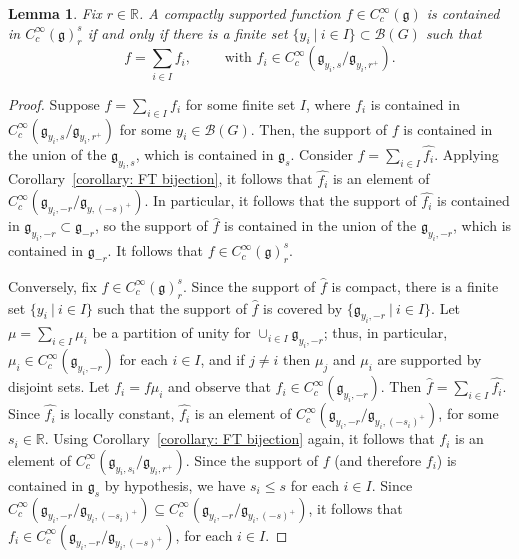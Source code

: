\documentclass[11pt]{amsart}
\newtheorem{lemma}[theorem]{Lemma}
\theoremstyle{definition}
\theoremstyle{remark}
\numberwithin{equation}{theorem}
\def\R{{\mathbb{R}}}
\def\GF{{G}}
\def\gF{{\mathfrak{g}}}
\def\B{{\mathcal{B}}}
\def\Sch#1{{C^\infty_c(#1)}}
\def\rightcoset{{ / }}
\def\tq{{\ \vert\ }}
\begin{document}
\begin{lemma}\label{lemma: depth r Hecke}
Fix $r\in \R$. A compactly supported function $f\in \Sch{\gF}$ is
contained in $\Sch{\gF}^s_r$ if and only if there is a finite set
$\{y_i \tq i\in I\} \subset \B(\GF)$ such that
\begin{equation}
f = \sum_{i\in I} f_i, \qquad \text{ with } f_i \in
\Sch{\gF_{y_i,s} \rightcoset \gF_{y_i,r^+}}. \label{eqn:f
partition}
\end{equation}
\end{lemma}

\begin{proof}
Suppose $f = \sum_{i\in I} f_i$ for some finite set $I$, where
$f_i$ is contained in $\Sch{\gF_{y_i,s} \rightcoset
\gF_{y_i,r^+}}$ for some $y_i\in \B(\GF)$. Then, the support of
$f$ is contained in the union of the $\gF_{y_i,s}$, which is
contained in $\gF_s$. Consider $\widehat{f} = \sum_{i\in I}
\widehat{f_i}$. Applying Corollary~\ref{corollary: FT bijection},
it follows that $\widehat{f_i}$ is an element of
$\Sch{\gF_{y_i,-r}\rightcoset\gF_{y,(-s)^+}}$. In particular, it
follows that the support of $\widehat{f_i}$ is contained in
$\gF_{y_i,-r} \subset \gF_{-r}$, so the support of $\widehat{f}$
is contained in the union of the $\gF_{y_i,-r}$, which is
contained in $\gF_{-r}$. It follows that $f\in \Sch{\gF}^s_r$.


Conversely, fix $f\in \Sch{\gF}^s_r$. Since the support of
$\widehat{f}$ is compact, there is a finite set $\{ y_i \tq i \in
I \}$ such that the support of $\widehat{f}$ is covered by $\{
\gF_{y_i,-r} \tq i \in I\}$. Let $\mu = \sum_{i\in I} \mu_i$ be a
partition of unity for $\cup_{i\in I} \gF_{y_i,-r}$; thus, in
particular, $\mu_i \in \Sch{\gF_{y_i, -r}}$ for each $i\in I$, and
if $j \ne i$ then $\mu_j$ and $\mu_i$ are supported by disjoint
sets. Let $f_i = f \mu_i$ and observe that $f_i \in
\Sch{\gF_{y_i,-r}}$. Then $\widehat{f} = \sum_{i\in I}
\widehat{f_i}$. Since $\widehat{f_i}$ is locally constant,
$\widehat{f_i}$ is an element of
$\Sch{\gF_{y_i,-r}/\gF_{y_i,(-s_i)^+}}$, for some $s_i \in \R$.
Using Corollary~\ref{corollary: FT bijection} again, it follows
that $f_i$ is an element of $\Sch{\gF_{y_i,s_i} \rightcoset
\gF_{y_i,r^+}}$. Since the support of $f$ (and therefore $f_i$) is
contained in $\gF_s$ by hypothesis, we have $s_i \leq s$ for each
$i\in I$. Since $\Sch{\gF_{y_i,-r}/\gF_{y_i,(-s_i)^+}} \subseteq
\Sch{\gF_{y_i,-r}/\gF_{y_i,(-s)^+}}$, it follows that $f_i \in
\Sch{\gF_{y_i,-r}/\gF_{y_i,(-s)^+}}$, for each $i\in I$.
\end{proof}
\end{document}
